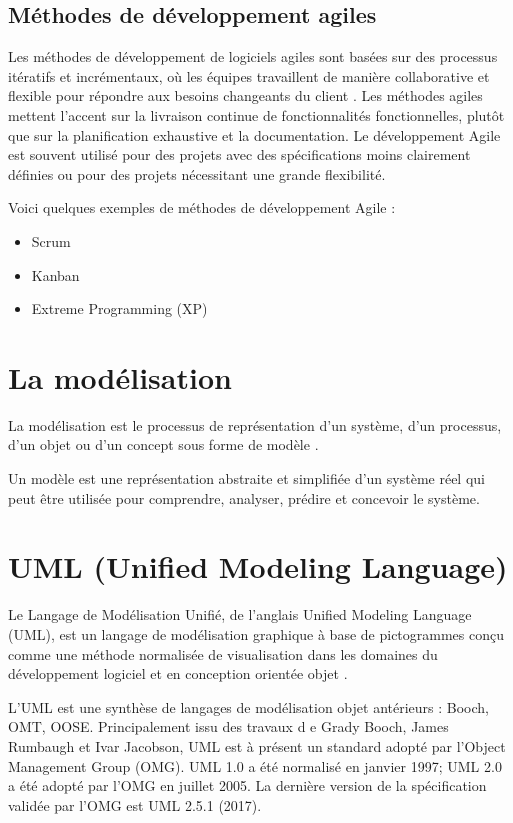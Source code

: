 \subsection{Méthodes de développement agiles}
Les méthodes de développement de logiciels agiles sont
basées sur des processus itératifs et incrémentaux, où les équipes
travaillent de manière collaborative et flexible pour répondre aux besoins
changeants du client \cite{martin2008clean}. Les méthodes agiles mettent l'accent sur la livraison continue
de fonctionnalités fonctionnelles, plutôt que sur la planification exhaustive et
la documentation. Le développement Agile est souvent utilisé pour des projets avec
des spécifications moins clairement définies ou pour des projets nécessitant une grande
flexibilité.

Voici quelques exemples de méthodes de développement Agile :

\begin{itemize}
    \item Scrum
    \item Kanban
    \item Extreme Programming (XP)
\end{itemize}




\section{La modélisation}\label{sec:modelisation}
La modélisation est le processus de représentation d'un système, d'un processus,
d'un objet ou d'un concept sous forme de modèle \cite{Friedenthal2014}.

Un modèle est une représentation abstraite et simplifiée d'un système réel qui
peut être utilisée pour comprendre, analyser, prédire et concevoir le système.

\section{UML (Unified Modeling Language)}\label{sec:uml}
Le Langage de Modélisation Unifié, de l'anglais Unified Modeling Language (UML),
est un langage de modélisation graphique à base de pictogrammes conçu comme une méthode
normalisée de visualisation dans les domaines du développement logiciel et en conception orientée objet \cite{Fowler2003}\cite{Booch1999}.

L'UML est une synthèse de langages de modélisation objet antérieurs : Booch, OMT, OOSE. Principalement issu des travaux d
e Grady Booch, James Rumbaugh et Ivar Jacobson, UML est à présent un standard adopté par
l'Object Management Group (OMG). UML 1.0 a été normalisé en janvier 1997; UML 2.0
a été adopté par l'OMG en juillet 2005.
La dernière version de la spécification validée par l'OMG est UML 2.5.1 (2017).

